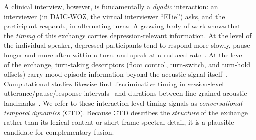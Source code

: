 \documentclass{article}
\begin{document}
A clinical interview, however, is fundamentally a \emph{dyadic} interaction: an interviewer (in DAIC-WOZ, the virtual interviewer ``Ellie'') asks, and the participant responds, in alternating turns. 
A growing body of work shows that the \emph{timing} of this exchange carries depression-relevant information. 
At the level of the individual speaker, depressed participants tend to respond more slowly, pause longer and more often within a turn, and speak at a reduced rate~\cite{yamamoto2020timing,mundt2012vocal,cummins2015review}. 
At the level of the exchange, turn-taking descriptors (floor control, turn-switch, and turn-hold offsets) carry mood-episode information beyond the acoustic signal itself~\cite{aldeneh2019mood}. 
Computational studies likewise find discriminative timing in session-level utterance/pause/response intervals~\cite{fushimi2026beyond} and durations between fine-grained acoustic landmarks~\cite{huang2020landmark,zhang2024llms}. 
We refer to these interaction-level timing signals as \emph{conversational temporal dynamics} (CTD). 
Because CTD describes the \emph{structure} of the exchange rather than its lexical content or short-frame spectral detail, it is a plausible candidate for complementary fusion.
\end{document}
